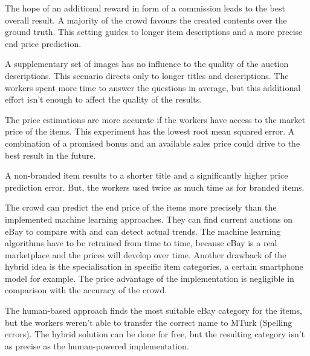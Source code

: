 The hope of an additional reward in form of a commission leads to the best overall result. A majority of the crowd favours the created contents over the ground truth. This setting guides to longer item descriptions and a more precise end price prediction.

A supplementary set of images has no influence to the quality of the auction descriptions. This scenario directs only to longer titles and descriptions. The workers spent more time to answer the questions in average, but this additional effort isn't enough to affect the quality of the results.

The price estimations are more accurate if the workers have access to the market price of the items. This experiment has the lowest root mean squared error. A combination of a promised bonus and an available sales price could drive to the best result in the future.

A non-branded item results to a shorter title and a significantly higher price prediction error. But, the workers used twice as much time as for branded items.

The crowd can predict the end price of the items more precisely than the implemented machine learning approaches. They can find current auctions on eBay to compare with and can detect actual trends. The machine learning algorithms have to be retrained from time to time, because eBay is a real marketplace and the prices will develop over time. Another drawback of the hybrid idea is the specialisation in specific item categories, a certain smartphone model for example. The price advantage of the implementation is negligible in comparison with the accuracy of the crowd.

The human-based approach finds the most suitable eBay category for the items, but the workers weren't able to transfer the correct name to MTurk (Spelling errors). The hybrid solution can be done for free, but the resulting category isn't as precise as the human-powered implementation.
